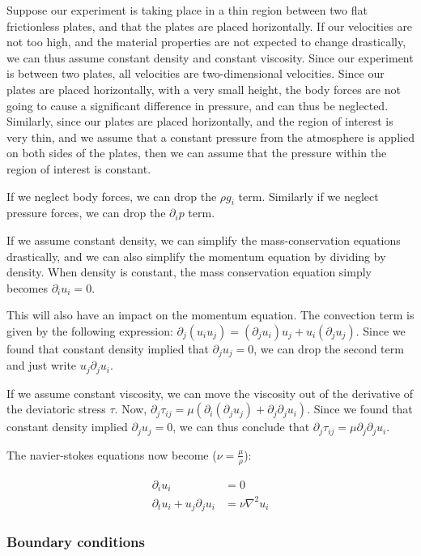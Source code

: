 \documentclass{article}
\begin{document}
Suppose our experiment is taking place in a thin region between two
	flat frictionless plates, and that the plates are placed horizontally.
If our velocities are not too high, and the material properties are not
	expected to change drastically, we can thus assume constant
	density and constant viscosity.
Since our experiment is between two plates, all velocities are two-dimensional
	velocities.
Since our plates are placed horizontally, with a very small height,
	the body forces are not going to cause a significant difference
	in pressure, and can thus be neglected.
Similarly, since our plates are placed horizontally, and the region
	of interest is very thin, and we assume that a constant pressure
	from the atmosphere is applied on both sides of the plates,
	then we can assume that the pressure within the region of 
	interest is constant.

If we neglect body forces, we can drop the $\rho g_i$ term.
Similarly if we neglect pressure forces, we can drop the $\partial_i p$ term.

If we assume constant density, we can simplify the mass-conservation
	equations drastically, and we can also simplify the momentum 
	equation by dividing by density. 
When density is constant, the mass conservation equation simply becomes
	$\partial_i u_i = 0$.

This will also have an impact on the momentum equation. 
The convection term is given by the following expression:
	$\partial_j \left( u_i u_j \right) =
	\left( \partial_j u_i \right) u_j 
	+ u_i \left( \partial_j u_j \right)$.
Since we found that constant density implied that $\partial_j u_j = 0$,
	we can drop the second term and just write $u_j \partial_j u_i$.

If we assume constant viscosity, we can move the viscosity out of the 
	derivative of the deviatoric stress $\tau$.
Now, $\partial_j \tau_{ij} = \mu \left( \partial_i 
	\left( \partial_j u_j \right) + \partial_j \partial_j u_i \right)$.
Since we found that constant density implied $\partial_j u_j = 0$,
	we can thus conclude that $\partial_j \tau_{ij} 
	= \mu \partial_j \partial_j u_i$.

The navier-stokes equations now become ($\nu = \frac{\mu}{\rho}$):

\begin{align}
\partial_i u_i & = 0 \\
\partial_t u_i + u_j \partial_j u_i & = \nu \nabla^2 u_i
\end{align}

\subsubsection{Boundary conditions}
\end{document}
